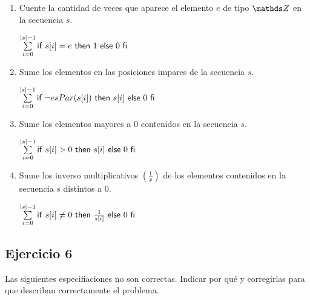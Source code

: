 \begin{enumerate}[label=\alph*)]
      \item Cuente la cantidad de veces que aparece el elemento $e$ de tipo $\ent$ en la secuencia $s$.

            $\sum\limits_{i=0}\limits^{|s| - 1} \mathsf{if}\ s[i] = e\ \mathsf{then}\ 1\ \mathsf{else}\ 0\ \mathsf{fi}$

      \item Sume los elementos en las posiciones impares de la secuencia $s$.

            $\sum\limits_{i=0}\limits^{|s| - 1} \mathsf{if}\ \neg esPar(s[i])\ \mathsf{then}\ s[i]\ \mathsf{else}\ 0\ \mathsf{fi}$

      \item Sume los elementos mayores a 0 contenidos en la secuencia $s$.

            $\sum\limits_{i=0}\limits^{|s| - 1} \mathsf{if}\ s[i] > 0\ \mathsf{then}\ s[i]\ \mathsf{else}\ 0\ \mathsf{fi}$

      \item Sume los inverso multiplicativos $(\frac{1}{x})$ de los elementos contenidos en la secuencia $s$ distintos a 0.

            $\sum\limits_{i=0}\limits^{|s| - 1} \mathsf{if}\ s[i] \neq 0\ \mathsf{then}\ \frac{1}{s[i]}\ \mathsf{else}\ 0\ \mathsf{fi}$
\end{enumerate}

\subsection{Ejercicio 6}
Las siguientes especifiaciones no son correctas. Indicar por qué y corregirlas para que describan correctamente el problema.

